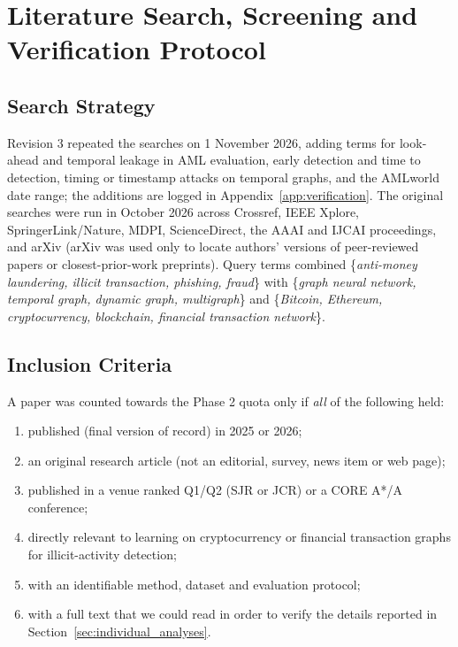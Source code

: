 \documentclass[11pt,a4paper]{article}
\begin{document}
\section{Literature Search, Screening and Verification Protocol}
\label{sec:selection}

\subsection{Search Strategy}
Revision 3 repeated the searches on 1 November 2026, adding terms for look-ahead and temporal leakage in AML evaluation, early detection and time to detection, timing or timestamp attacks on temporal graphs, and the AMLworld date range; the additions are logged in Appendix~\ref{app:verification}. The original searches were run in October 2026 across Crossref, IEEE Xplore, SpringerLink/Nature, MDPI, ScienceDirect, the AAAI and IJCAI proceedings, and arXiv (arXiv was used only to locate authors' versions of peer-reviewed papers or closest-prior-work preprints). Query terms combined \{\textit{anti-money laundering, illicit transaction, phishing, fraud}\} with \{\textit{graph neural network, temporal graph, dynamic graph, multigraph}\} and \{\textit{Bitcoin, Ethereum, cryptocurrency, blockchain, financial transaction network}\}.

\subsection{Inclusion Criteria}
A paper was counted towards the Phase 2 quota only if \emph{all} of the following held:
\begin{enumerate}[leftmargin=*]
    \item published (final version of record) in 2025 or 2026;
    \item an original research article (not an editorial, survey, news item or web page);
    \item published in a venue ranked Q1/Q2 (SJR or JCR) or a CORE A*/A conference;
    \item directly relevant to learning on cryptocurrency or financial transaction graphs for illicit-activity detection;
    \item with an identifiable method, dataset and evaluation protocol;
    \item with a full text that we could read in order to verify the details reported in Section~\ref{sec:individual_analyses}.
\end{enumerate}
\end{document}
